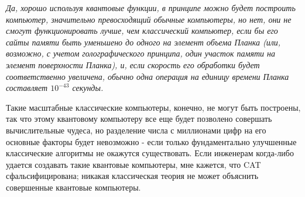 \documentclass[main.tex]{subfiles}
\begin{document}
\textit{Да, хорошо используя квантовые функции, в принципе можно будет построить компьютер, значительно превосходящий обычные компьютеры, но нет, они не смогут функционировать лучше, чем классический компьютер, если бы его сайты памяти быть уменьшено до одного на элемент объема Планка (или, возможно, с учетом голографического принципа, один участок памяти на элемент поверхности Планка), и, если скорость его обработки будет соответственно увеличена, обычно одна операция на единицу времени Планка составляет $10^{-43}$ секунды.}


Такие масштабные классические компьютеры, конечно, не могут быть построены, так что этому квантовому компьютеру все еще будет позволено совершать вычислительные чудеса, но разделение числа с миллионами цифр на его основные факторы будет невозможно - если только фундаментально улучшенные классические алгоритмы не окажутся существовать. Если инженерам когда-либо удается создавать такие квантовые компьютеры, мне кажется, что CAT сфальсифицирована; никакая классическая теория не может объяснить совершенные квантовые компьютеры.
\end{document}
